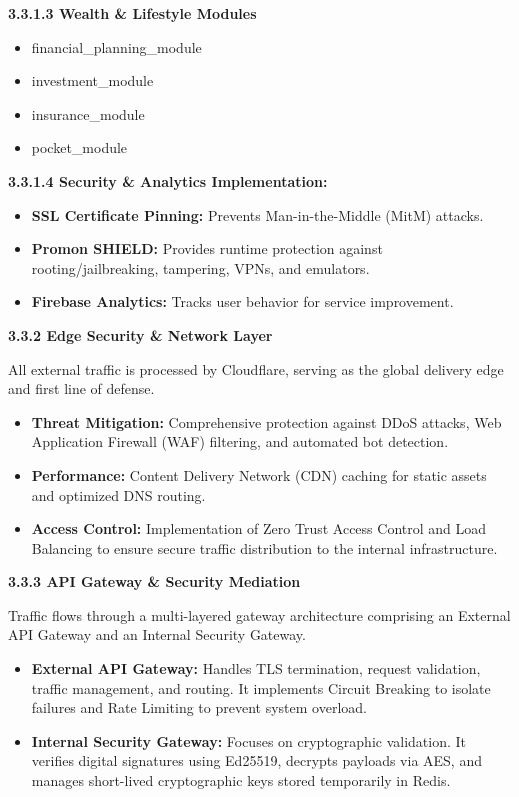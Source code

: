 \textbf{3.3.1.3 Wealth \& Lifestyle Modules}

\begin{itemize}
\item
  financial\_planning\_module
\item
  investment\_module
\item
  insurance\_module
\item
  pocket\_module
\end{itemize}

\textbf{3.3.1.4 Security \& Analytics Implementation:}

\begin{itemize}
\item
  \textbf{SSL Certificate Pinning:} Prevents Man-in-the-Middle (MitM)
  attacks.
\item
  \textbf{Promon SHIELD:} Provides runtime protection against
  rooting/jailbreaking, tampering, VPNs, and emulators.
\item
  \textbf{Firebase Analytics:} Tracks user behavior for service
  improvement.
\end{itemize}

\textbf{3.3.2 Edge Security \& Network Layer}

All external traffic is processed by Cloudflare, serving as the global
delivery edge and first line of defense.

\begin{itemize}
\item
  \textbf{Threat Mitigation:} Comprehensive protection against DDoS
  attacks, Web Application Firewall (WAF) filtering, and automated bot
  detection.
\item
  \textbf{Performance:} Content Delivery Network (CDN) caching for
  static assets and optimized DNS routing.
\item
  \textbf{Access Control:} Implementation of Zero Trust Access Control
  and Load Balancing to ensure secure traffic distribution to the
  internal infrastructure.
\end{itemize}

\textbf{3.3.3 API Gateway \& Security Mediation}

Traffic flows through a multi-layered gateway architecture comprising an
External API Gateway and an Internal Security Gateway.

\begin{itemize}
\item
  \textbf{External API Gateway:} Handles TLS termination, request
  validation, traffic management, and routing. It implements Circuit
  Breaking to isolate failures and Rate Limiting to prevent system
  overload.
\item
  \textbf{Internal Security Gateway:} Focuses on cryptographic
  validation. It verifies digital signatures using Ed25519, decrypts
  payloads via AES, and manages short-lived cryptographic keys stored
  temporarily in Redis.
\end{itemize}

